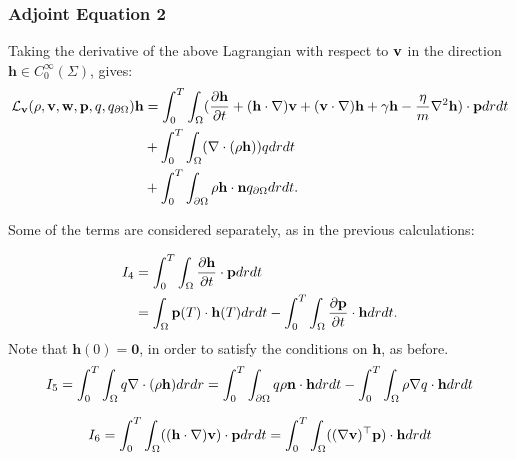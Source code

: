 \subsubsection{Adjoint Equation 2}

Taking the derivative of the above Lagrangian with respect to $\mathbf{v}$ in the direction $\mathbf{h} \in C_0^\infty(\Sigma)$, gives:
\begin{align*}
\mathcal{L}_{\mathbf{v}}(\rho,\mathbf{v},\mathbf{w},\mathbf{p},q,{q}_{\partial \Omega})\mathbf{h} &=  \int_0^T \int_\Omega ( \frac{\partial \mathbf{h} }{\partial t} +  (\mathbf{h} \cdot \nabla)\mathbf{v} +  (\mathbf{v} \cdot \nabla)\mathbf{h} +  \gamma \mathbf{h} - \frac{\eta}{m}\nabla^2 \mathbf{h}) \cdot \mathbf{p} dr dt\\
& + \int_0^T \int_\Omega ( \nabla \cdot (\rho \mathbf{h})) q dr dt\\ 
& +\int_0^T \int_{\partial\Omega} \rho \mathbf{h} \cdot \mathbf{n} {q}_{\partial \Omega} dr dt.
\end{align*}

Some of the terms are considered separately, as in the previous calculations:

\begin{align*}
I_4 &= \int_0^T \int_\Omega  \frac{\partial \mathbf{h} }{\partial t} \cdot \mathbf{p} dr dt \\
&= \int_\Omega \mathbf{p}(T) \cdot \mathbf{h}(T) dr dt  - \int_0^T \int_\Omega \frac{\partial \mathbf{p}}{\partial t} \cdot \mathbf{h} dr dt.
\end{align*}
Note that $\mathbf{h}(0)=\mathbf{0}$, in order to satisfy the conditions on $\mathbf{h}$, as before.
\begin{align*}
I_5= \int_0^T \int_\Omega q\nabla \cdot ( \rho \mathbf{h}) dr dr = \int_0^T \int_{\partial \Omega} q \rho  \mathbf{n}\cdot \mathbf{h} dr dt - \int_0^T \int_\Omega \rho\nabla q \cdot  \mathbf{h} dr dt
\end{align*}

\begin{align*}
I_6 = \int_0^T \int_\Omega  ((\mathbf{h} \cdot \nabla)\mathbf{v} ) \cdot\mathbf{p} dr dt = \int_0^T \int_\Omega  ((\nabla \mathbf{v})^\top\mathbf{p}) \cdot  \mathbf{h} dr dt
\end{align*}

